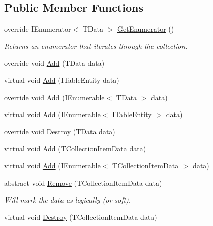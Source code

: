 \subsection*{Public Member Functions}
\begin{DoxyCompactItemize}
\item 
override I\+Enumerator$<$ T\+Data $>$ \hyperlink{classCqrs_1_1Azure_1_1BlobStorage_1_1TableStorageStore_ac3e684b894e739f8936e537806952c49}{Get\+Enumerator} ()
\begin{DoxyCompactList}\small\item\em Returns an enumerator that iterates through the collection. \end{DoxyCompactList}\item 
override void \hyperlink{classCqrs_1_1Azure_1_1BlobStorage_1_1TableStorageStore_ad9becfb4b149c645450deba342696e54}{Add} (T\+Data data)
\item 
virtual void \hyperlink{classCqrs_1_1Azure_1_1BlobStorage_1_1TableStorageStore_aa8e6b41c32dd8f81d5ff852693e7979d}{Add} (I\+Table\+Entity data)
\item 
override void \hyperlink{classCqrs_1_1Azure_1_1BlobStorage_1_1TableStorageStore_a2b10c02a19150d5a68e6dcb4810ea8a1}{Add} (I\+Enumerable$<$ T\+Data $>$ data)
\item 
virtual void \hyperlink{classCqrs_1_1Azure_1_1BlobStorage_1_1TableStorageStore_a120c6fbb947cf4d37f60335df0182008}{Add} (I\+Enumerable$<$ I\+Table\+Entity $>$ data)
\item 
override void \hyperlink{classCqrs_1_1Azure_1_1BlobStorage_1_1TableStorageStore_a1ad02e710a3fe1d794d99db332c351dc}{Destroy} (T\+Data data)
\item 
virtual void \hyperlink{classCqrs_1_1Azure_1_1BlobStorage_1_1TableStorageStore_ae48083bacf8a74175122e7618ae2a605}{Add} (T\+Collection\+Item\+Data data)
\item 
virtual void \hyperlink{classCqrs_1_1Azure_1_1BlobStorage_1_1TableStorageStore_a79dc78a910107ede003b145a2da25897}{Add} (I\+Enumerable$<$ T\+Collection\+Item\+Data $>$ data)
\item 
abstract void \hyperlink{classCqrs_1_1Azure_1_1BlobStorage_1_1TableStorageStore_a8e013351f5dcccd1915bf7ed6c58317e}{Remove} (T\+Collection\+Item\+Data data)
\begin{DoxyCompactList}\small\item\em Will mark the {\itshape data}  as logically (or soft). \end{DoxyCompactList}\item 
virtual void \hyperlink{classCqrs_1_1Azure_1_1BlobStorage_1_1TableStorageStore_a0b408504b9553b9c649b7186a382052a}{Destroy} (T\+Collection\+Item\+Data data)

\end{DoxyCompactItemize}
